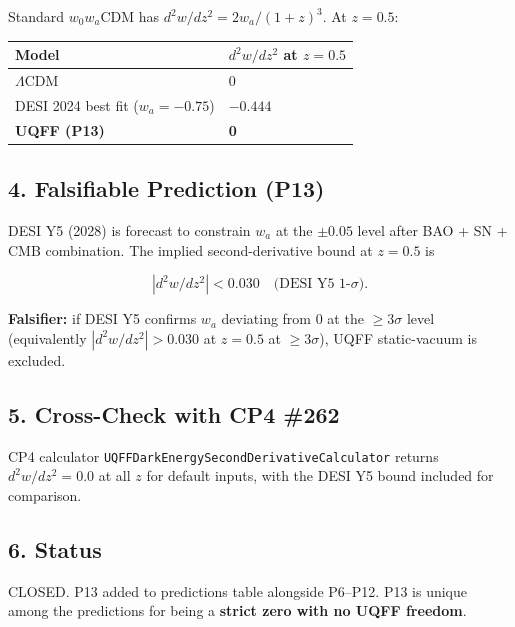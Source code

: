 \documentclass[
]{article}
\newcounter{none} %
\begin{document}
Standard \(w_0 w_a\)CDM has \(d^2 w/dz^2 = 2 w_a/(1+z)^3\). At
\(z = 0.5\):

{\def\LTcaptype{none} %
\begin{longtable}[]{@{}ll@{}}
\toprule\noalign{}
Model & \(d^2 w/dz^2\) at \(z=0.5\) \\
\midrule\noalign{}
\endhead
\bottomrule\noalign{}
\endlastfoot
\(\Lambda\)CDM & 0 \\
DESI 2024 best fit (\(w_a = -0.75\)) & \(-0.444\) \\
\textbf{UQFF (P13)} & \textbf{0} \\
\end{longtable}
}

\subsection{4. Falsifiable Prediction
(P13)}\label{falsifiable-prediction-p13}

DESI Y5 (2028) is forecast to constrain \(w_a\) at the \(\pm 0.05\)
level after BAO + SN + CMB combination. The implied second-derivative
bound at \(z = 0.5\) is

\[
|d^2 w/dz^2| < 0.030 \quad \text{(DESI Y5 1-}\sigma\text{)} .
\]

\textbf{Falsifier:} if DESI Y5 confirms \(w_a\) deviating from 0 at the
\(\ge 3\sigma\) level (equivalently \(|d^2 w/dz^2| > 0.030\) at
\(z = 0.5\) at \(\ge 3\sigma\)), UQFF static-vacuum is excluded.

\subsection{5. Cross-Check with CP4
\#262}\label{cross-check-with-cp4-262}

CP4 calculator \texttt{UQFFDarkEnergySecondDerivativeCalculator} returns
\(d^2 w/dz^2 = 0.0\) at all \(z\) for default inputs, with the DESI Y5
bound included for comparison.

\subsection{6. Status}\label{status}

CLOSED. P13 added to predictions table alongside P6--P12. P13 is unique
among the predictions for being a \textbf{strict zero with no UQFF
freedom}.




\end{document}
